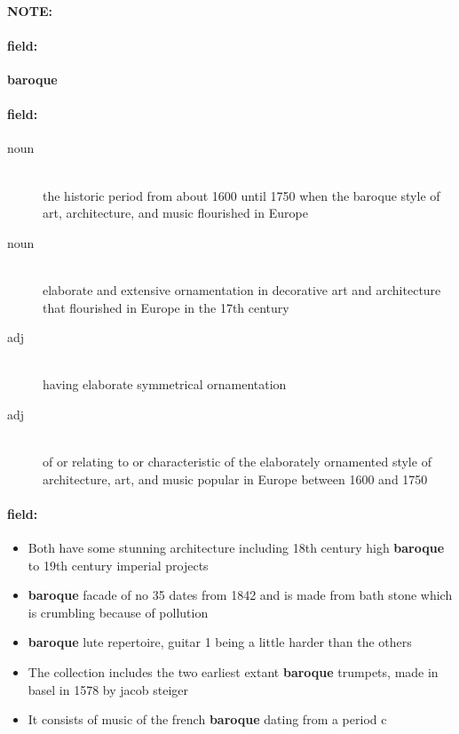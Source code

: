 \documentclass[12pt]{article}
\newenvironment{note}{\paragraph{NOTE:}}{}
\newenvironment{field}{\paragraph{field:}}{}
\begin{document}
\begin{note}
\begin{field}
\textbf{\large baroque}
\end{field}


\begin{field}
\begin{description}
\item[noun] \hfill \\ 
the historic period from about 1600 until 1750 when the baroque style of art, architecture, and music flourished in Europe

\item[noun] \hfill \\ 
elaborate and extensive ornamentation in decorative art and architecture that flourished in Europe in the 17th century

\item[adj] \hfill \\ 
having elaborate symmetrical ornamentation

\item[adj] \hfill \\ 
of or relating to or characteristic of the elaborately ornamented style of architecture, art, and music popular in Europe between 1600 and 1750

\end{description}
\end{field}

\begin{field}
\begin{itemize}
\item Both have some stunning architecture including 18th century high \textbf{baroque} to 19th century imperial projects
\item \textbf{baroque} facade of no 35 dates from 1842 and is made from bath stone which is crumbling because of pollution
\item \textbf{baroque} lute repertoire, guitar 1 being a little harder than the others
\item The collection includes the two earliest extant \textbf{baroque} trumpets, made in basel in 1578 by jacob steiger
\item It consists of music of the french \textbf{baroque} dating from a period c
\end{itemize}
\end{field}
\end{note}
\end{document}
